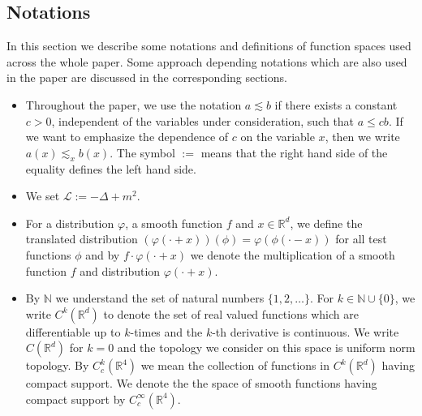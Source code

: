 \documentclass{article}
\newcommand{\assign}{:=}
\newenvironment{itemizedot}{\begin{itemize} \renewcommand{\labelitemi}{$\bullet$}\renewcommand{\labelitemii}{$\bullet$}\renewcommand{\labelitemiii}{$\bullet$}\renewcommand{\labelitemiv}{$\bullet$}}{\end{itemize}}
\begin{document}
\subsection{Notations}\label{sec-notation}
In this section we describe some notations and definitions of function spaces used across the whole paper. Some approach depending notations which are also used in the paper are discussed in the corresponding sections.
%
\begin{itemizedot}
  \item Throughout the paper, we use the notation $a \lesssim b$ if there exists a constant $c > 0$, independent of the variables under consideration, such that $a \leqslant c b$. If we want to emphasize the dependence of $c$ on the variable $x$, then we write $a (x) \lesssim_x b (x)$. The symbol $\assign$ means that the right hand side of the equality defines the left hand side.
  
  \item We set $\mathcal{L} \assign - \Delta + m^2$.
  
  \item For a distribution $\varphi$, a smooth function $f$ and $x \in
  \mathbb{R}^d$, we define the translated distribution $(\varphi (\cdot + x))(\phi) = \varphi (\phi (\cdot - x))$ for all test functions $\phi$ and by $f\cdot \varphi (\cdot + x)$ we denote the multiplication of a smooth function $f$ and distribution $\varphi (\cdot + x)$.
  
  \item By $\mathbb{N}$ we understand the set of natural numbers $\{ 1, 2, \ldots \}.$ For $k \in \mathbb{N} \cup \{ 0 \}$, we write $C^k  (\mathbb{R}^d)$ to denote the set of real valued functions which are
  differentiable up to $k$-times and the $k$-th derivative is continuous. We write $C (\mathbb{R}^d)$ for $k = 0$ and the topology we consider on this space is uniform norm topology. By $C_c^k (\mathbb{R}^4)$ we mean the collection of functions in $C^k  (\mathbb{R}^d)$ having compact support. We denote the the space of smooth functions having compact support by $C_c^{\infty} (\mathbb{R}^4)$. 
  

\end{itemizedot}
\end{document}
